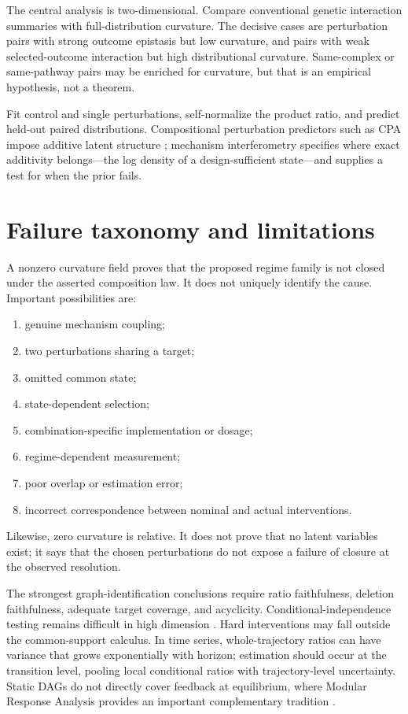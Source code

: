 \documentclass[11pt]{article}
\begin{document}
The central analysis is two-dimensional.  Compare conventional genetic interaction summaries with full-distribution curvature.  The decisive cases are perturbation pairs with strong outcome epistasis but low curvature, and pairs with weak selected-outcome interaction but high distributional curvature.  Same-complex or same-pathway pairs may be enriched for curvature, but that is an empirical hypothesis, not a theorem.

Fit control and single perturbations, self-normalize the product ratio, and predict held-out paired distributions.  Compositional perturbation predictors such as CPA impose additive latent structure \citep{lotfollahi2023cpa}; mechanism interferometry specifies where exact additivity belongs---the log density of a design-sufficient state---and supplies a test for when the prior fails.

\section{Failure taxonomy and limitations}

A nonzero curvature field proves that the proposed regime family is not closed under the asserted composition law.  It does not uniquely identify the cause.  Important possibilities are:
\begin{enumerate}
\item genuine mechanism coupling;
\item two perturbations sharing a target;
\item omitted common state;
\item state-dependent selection;
\item combination-specific implementation or dosage;
\item regime-dependent measurement;
\item poor overlap or estimation error;
\item incorrect correspondence between nominal and actual interventions.
\end{enumerate}

Likewise, zero curvature is relative.  It does not prove that no latent variables exist; it says that the chosen perturbations do not expose a failure of closure at the observed resolution.

The strongest graph-identification conclusions require ratio faithfulness, deletion faithfulness, adequate target coverage, and acyclicity.  Conditional-independence testing remains difficult in high dimension \citep{shah2020gcm}.  Hard interventions may fall outside the common-support calculus.  In time series, whole-trajectory ratios can have variance that grows exponentially with horizon; estimation should occur at the transition level, pooling local conditional ratios with trajectory-level uncertainty.  Static DAGs do not directly cover feedback at equilibrium, where Modular Response Analysis provides an important complementary tradition \citep{bruggeman2002mra,kholodenko2002untangling}.
\end{document}
